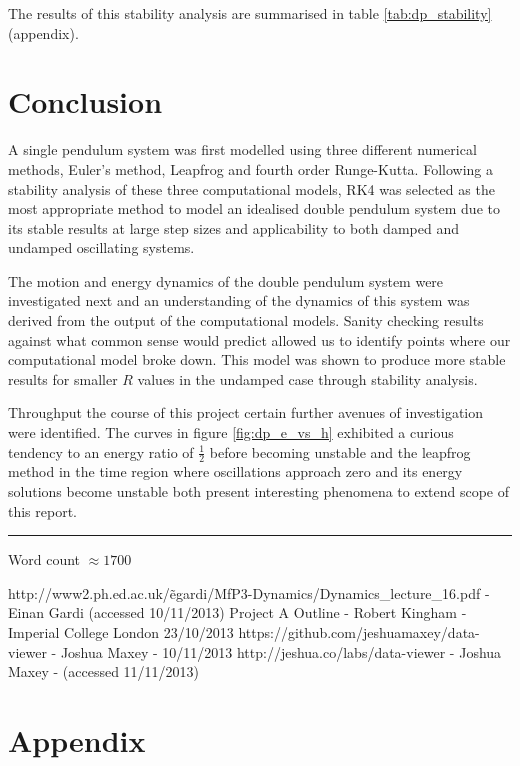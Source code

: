 \documentclass[11pt]{article}
\begin{document}
The results of this stability analysis are summarised in table \ref{tab:dp_stability} (appendix).

\section{Conclusion}
A single pendulum system was first modelled using three different numerical methods, Euler's method, Leapfrog and fourth order Runge-Kutta. Following a stability analysis of these three computational models, RK4 was selected as the most appropriate method to model an idealised double pendulum system due to its stable results at large step sizes and applicability to both damped and undamped oscillating systems.

The motion and energy dynamics of the double pendulum system were investigated next and an understanding of the dynamics of this system was derived from the output of the computational models. Sanity checking results against what common sense would predict allowed us to identify points where our computational model broke down. This model was shown to produce more stable results for smaller $R$ values in the undamped case through stability analysis.

Throughput the course of this project certain further avenues of investigation were identified. The curves in figure \ref{fig:dp_e_vs_h} exhibited a curious tendency to an energy ratio of $\frac{1}{2}$ before becoming unstable and the leapfrog method in the time region where oscillations approach zero and its energy solutions become unstable both present interesting phenomena to extend scope of this report.

\vspace{15pt}
\hrule
\vspace{15pt}
Word count $\approx 1700$

\begin{thebibliography}{10}
 http://www2.ph.ed.ac.uk/\~egardi/MfP3-Dynamics/Dynamics\_lecture\_16.pdf - Einan Gardi (accessed 10/11/2013)
 Project A Outline - Robert Kingham - Imperial College London 23/10/2013
 https://github.com/jeshuamaxey/data-viewer - Joshua Maxey - 10/11/2013
 http://jeshua.co/labs/data-viewer - Joshua Maxey - (accessed 11/11/2013)
\end{thebibliography}

\newpage
\section{Appendix} \label{app:Appendix}
\end{document}
